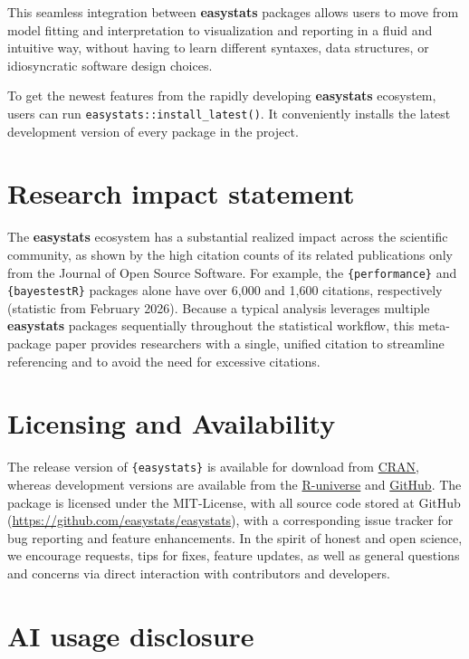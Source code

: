 \documentclass{article}
\begin{document}
This seamless integration between \textbf{easystats} packages allows
users to move from model fitting and interpretation to visualization and
reporting in a fluid and intuitive way, without having to learn
different syntaxes, data structures, or idiosyncratic software design
choices.

To get the newest features from the rapidly developing
\textbf{easystats} ecosystem, users can run
\texttt{easystats::install\_latest()}. It conveniently installs the
latest development version of every package in the project.

\section{Research impact statement}\label{research-impact-statement}

The \textbf{easystats} ecosystem has a substantial realized impact
across the scientific community, as shown by the high citation counts of
its related publications only from the Journal of Open Source Software.
For example, the \texttt{\{performance\}} and \texttt{\{bayestestR\}}
packages alone have over 6,000 and 1,600 citations, respectively
(statistic from February 2026). Because a typical analysis leverages
multiple \textbf{easystats} packages sequentially throughout the
statistical workflow, this meta-package paper provides researchers with
a single, unified citation to streamline referencing and to avoid the
need for excessive citations.

\section{Licensing and Availability}\label{licensing-and-availability}

The release version of \texttt{\{easystats\}} is available for download
from \href{https://doi.org/10.32614/CRAN.package.easystats}{CRAN},
whereas development versions are available from the
\href{https://easystats.r-universe.dev/easystats}{R-universe} and
\href{https://github.com/easystats/easystats/}{GitHub}. The package is
licensed under the MIT-License, with all source code stored at GitHub
(\url{https://github.com/easystats/easystats}), with a corresponding
issue tracker for bug reporting and feature enhancements. In the spirit
of honest and open science, we encourage requests, tips for fixes,
feature updates, as well as general questions and concerns via direct
interaction with contributors and developers.

\section{AI usage disclosure}\label{ai-usage-disclosure}
\end{document}
